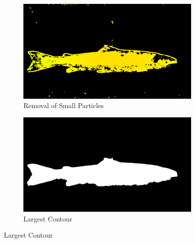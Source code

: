 \begin{figure}[H]
    \medskip
    \begin{subfigure}{0.49\textwidth}
        \includegraphics[width=\linewidth]{images/implementation/3_remove_particles}
        \caption{Removal of Small Particles} 
        \label{fig:remove_particles}
    \end{subfigure}\hspace*{\fill}
    \begin{subfigure}{0.49\textwidth}
        \includegraphics[width=\linewidth]{images/implementation/4_largest_contour}
        \caption{Largest Contour} 
        \label{fig:largest_contour}
    \end{subfigure}
    

\end{figure}
